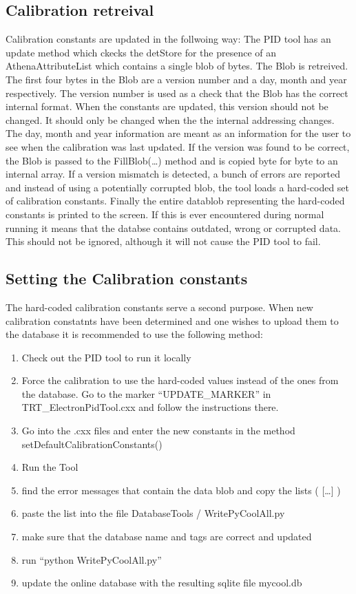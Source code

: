 \documentclass[a4paper,11pt]{article}
\begin{document}
\subsection{Calibration retreival}
Calibration constants are updated in the follwoing way: The PID tool
has an update method which ckecks the detStore for the presence of an
AthenaAttributeList which contains a single blob of bytes. The Blob is
retreived. The first four bytes in the Blob are a version number and a
day, month and year respectively. The version number is used as a
check that the Blob has the correct internal format. When the
constants are updated, this version should not be changed. It should
only be changed when the the internal addressing changes. The day,
month and year information are meant as an information for the user to
see when the calibration was last updated. If the version was found to
be correct, the Blob is passed to the FillBlob(\ldots) method and is
copied byte for byte to an internal array. If a version mismatch is
detected, a bunch of errors are reported and instead of using a
potentially corrupted blob, the tool loads a hard-coded set of
calibration constants. Finally the entire datablob representing the
hard-coded constants is printed to the screen. If this is ever
encountered during normal running it means that the databse contains
outdated, wrong or corrupted data. This should not be ignored,
although it will not cause the PID tool to fail.

\subsection{Setting the Calibration constants}
The hard-coded calibration constants serve a second purpose. When new
calibration constatnts have been determined and one wishes to upload
them to the database it is recommended to use the following method:
\begin{enumerate}
\item Check out the PID tool to run it locally
\item Force the calibration to use the hard-coded values instead of
  the ones from the database. Go to the marker ``UPDATE\_MARKER'' in
  TRT\_ElectronPidTool.cxx and follow the instructions there.
\item Go into the .cxx files and enter the new constants in the method
  setDefaultCalibrationConstants()
\item Run the Tool
\item find the error messages that contain the data blob and copy the
  lists ( [\ldots] )
\item paste the list into the file DatabaseTools / WritePyCoolAll.py
\item make sure that the database name and tags are correct and
  updated
\item run ``python WritePyCoolAll.py''
\item update the online database with the resulting sqlite file
  mycool.db
\end{enumerate}
\end{document}
